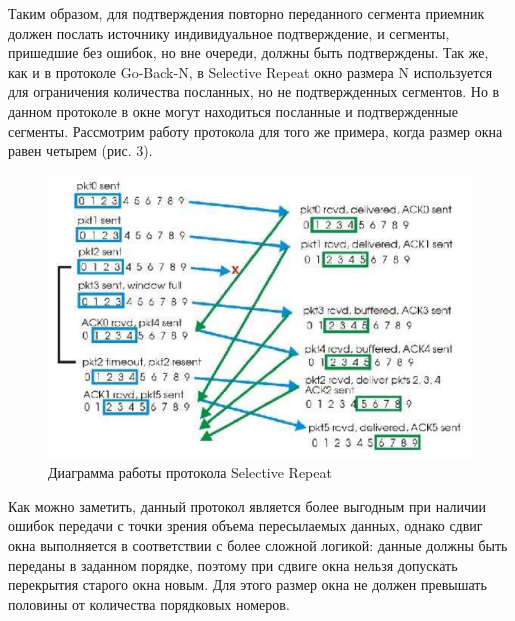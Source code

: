 Таким образом, для подтверждения повторно переданного сегмента
приемник должен послать источнику индивидуальное подтверждение, и
сегменты, пришедшие без ошибок, но вне очереди, должны быть
подтверждены. Так же, как и в протоколе Go-Back-N, в Selective Repeat окно размера N используется для ограничения количества посланных, но не
подтвержденных сегментов. Но в данном протоколе в окне могут находиться
посланные и подтвержденные сегменты. Рассмотрим работу протокола для
того же примера, когда размер окна равен четырем (рис. 3).

\begin{figure}[H]
	\begin{center}
		\includegraphics[scale=0.6]{im3}
		\caption{Диаграмма работы протокола Selective Repeat}
	\end{center}
\end{figure}

Как можно заметить, данный протокол является более выгодным при
наличии ошибок передачи с точки зрения объема пересылаемых данных, однако сдвиг окна выполняется в соответствии с более сложной логикой: данные должны быть переданы в заданном порядке, поэтому при сдвиге окна нельзя допускать перекрытия старого окна новым.
Для этого размер окна не должен превышать половины от количества
порядковых номеров.
